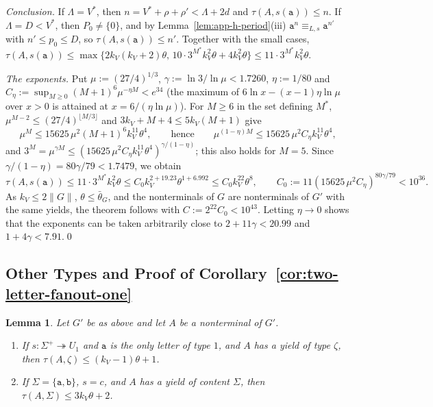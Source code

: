 \documentclass[11pt]{article}
\numberwithin{equation}{section}
\theoremstyle{plain}
\newtheorem{lemma}[theorem]{Lemma}
\theoremstyle{definition}
\theoremstyle{remark}
\theoremstyle{plain}
\begin{document}
\emph{Conclusion.}  If $\Lambda=V^*$, then $n=V^*+\rho+\rho'<\Lambda+2d$ and
$\tau(A,s(\mathtt a))\le n$.  If $\Lambda=D<V^*$, then $P_0\ne\{0\}$, and by
Lemma~\ref{lem:app-h-period}(iii) $\mathtt a^n\equiv_{L,s}\mathtt a^{n'}$ with
$n'\le p_0\le D$, so $\tau(A,s(\mathtt a))\le n'$.  Together with the small cases,
$\tau(A,s(\mathtt a))\le\max\{2k_V(k_V+2)\theta,\,10\cdot3^{M^*}k_V^2\theta+4k_V^2\theta\}
\le11\cdot3^{M^*}k_V^2\theta$.

\emph{The exponents.}  Put $\mu:=(27/4)^{1/3}$, $\gamma:=\ln3/\ln\mu<1.7260$,
$\eta:=1/80$ and $C_\eta:=\sup_{M\ge0}(M+1)^6\mu^{-\eta M}<e^{34}$ (the maximum of
$6\ln x-(x-1)\eta\ln\mu$ over $x>0$ is attained at $x=6/(\eta\ln\mu)$).  For $M\ge6$
in the set defining $M^*$, $\mu^{M-2}\le(27/4)^{\lfloor M/3\rfloor}$ and
$3k_V+M+4\le5k_V(M+1)$ give
\[
 \mu^M\le15625\,\mu^2(M+1)^6k_V^{11}\theta^4,\qquad\text{hence}\qquad
 \mu^{(1-\eta)M}\le15625\,\mu^2C_\eta k_V^{11}\theta^4,
\]
and $3^M=\mu^{\gamma M}\le(15625\,\mu^2C_\eta k_V^{11}\theta^4)^{\gamma/(1-\eta)}$;
this also holds for $M=5$.  Since $\gamma/(1-\eta)=80\gamma/79<1.7479$, we obtain
\[
 \tau(A,s(\mathtt a))\le11\cdot3^{M^*}k_V^2\theta\le C_0k_V^{2+19.23}\theta^{1+6.992}
 \le C_0k_V^{22}\theta^8,\qquad C_0:=11(15625\,\mu^2C_\eta)^{80\gamma/79}<10^{36}.
\]
As $k_V\le2\|G\|$, $\theta\le\bar\theta_G$, and the nonterminals of $G$ are
nonterminals of $G'$ with the same yields, the theorem follows with
$C:=2^{22}C_0<10^{43}$.  Letting $\eta\to0$ shows that the exponents can be taken
arbitrarily close to $2+11\gamma<20.99$ and $1+4\gamma<7.91$.\qed

\subsection{Other Types and Proof of Corollary~\ref{cor:two-letter-fanout-one}}

\begin{lemma}
\label{lem:app-h-other}
Let $G'$ be as above and let $A$ be a nonterminal of $G'$.
\begin{enumerate}[label=\textup{(\roman*)},leftmargin=*]
\item If $s:\Sigma^+\twoheadrightarrow U_1$ and $\mathtt a$ is the only letter of
type $1$, and $A$ has a yield of type $\zeta$, then
$\tau(A,\zeta)\le(k_V-1)\theta+1$.
\item If $\Sigma=\{\mathtt a,\mathtt b\}$, $s=c$, and $A$ has a yield of content
$\Sigma$, then $\tau(A,\Sigma)\le3k_V\theta+2$.
\end{enumerate}
\end{lemma}
\end{document}
